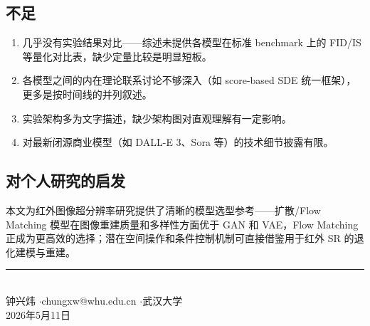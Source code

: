 \documentclass[11pt,a4paper]{ctexart}
\begin{document}
\subsection*{不足}

\begin{enumerate}[leftmargin=*, itemsep=1pt]
    \item 几乎没有实验结果对比——综述未提供各模型在标准 benchmark 上的 FID/IS 等量化对比表，缺少定量比较是明显短板。
    \item 各模型之间的内在理论联系讨论不够深入（如 score-based SDE 统一框架），更多是按时间线的并列叙述。
    \item 实验架构多为文字描述，缺少架构图对直观理解有一定影响。
    \item 对最新闭源商业模型（如 DALL-E 3、Sora 等）的技术细节披露有限。
\end{enumerate}

\subsection*{对个人研究的启发}

本文为红外图像超分辨率研究提供了清晰的模型选型参考——扩散/Flow Matching 模型在图像重建质量和多样性方面优于 GAN 和 VAE，Flow Matching 正成为更高效的选择；潜在空间操作和条件控制机制可直接借鉴用于红外 SR 的退化建模与重建。

\vspace{8mm}

\begin{center}
\rule{0.5\textwidth}{0.4pt}\\[3mm]
{\small 钟兴炜 \quad$\cdot$\quad chungxw@whu.edu.cn \quad$\cdot$\quad 武汉大学 \\[1mm]
  2026年5月11日}
\end{center}
\end{document}
